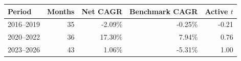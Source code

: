\begin{tabular}{lrrrr}
\toprule
Period & Months & Net CAGR & Benchmark CAGR & Active $t$ \\
\midrule
2016--2019 & 35 & -2.09\% & -0.25\% & -0.21 \\
2020--2022 & 36 & 17.30\% & 7.94\% & 0.76 \\
2023--2026 & 43 & 1.06\% & -5.31\% & 1.00 \\
\bottomrule
\end{tabular}
